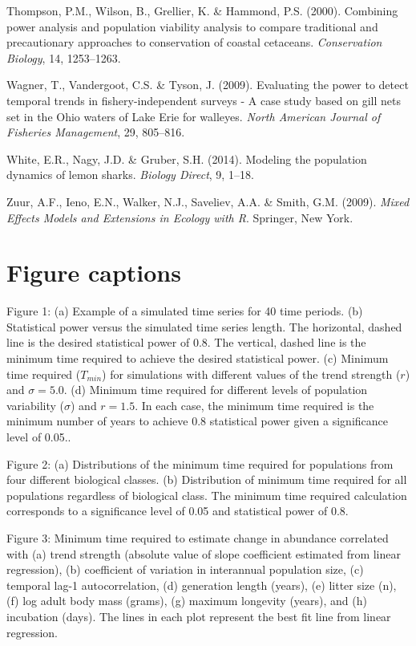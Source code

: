 \documentclass[12pt,]{article}
\begin{document}
\hypertarget{ref-Thompson2000}{}
Thompson, P.M., Wilson, B., Grellier, K. \& Hammond, P.S. (2000).
Combining power analysis and population viability analysis to compare
traditional and precautionary approaches to conservation of coastal
cetaceans. \emph{Conservation Biology}, 14, 1253--1263.

\hypertarget{ref-Wagner2009}{}
Wagner, T., Vandergoot, C.S. \& Tyson, J. (2009). Evaluating the power
to detect temporal trends in fishery-independent surveys - A case study
based on gill nets set in the Ohio waters of Lake Erie for walleyes.
\emph{North American Journal of Fisheries Management}, 29, 805--816.

\hypertarget{ref-White2014}{}
White, E.R., Nagy, J.D. \& Gruber, S.H. (2014). Modeling the population
dynamics of lemon sharks. \emph{Biology Direct}, 9, 1--18.

\hypertarget{ref-Zuur2009}{}
Zuur, A.F., Ieno, E.N., Walker, N.J., Saveliev, A.A. \& Smith, G.M.
(2009). \emph{Mixed Effects Models and Extensions in Ecology with R}.
Springer, New York.

\clearpage

\pagebreak

\section{Figure captions}\label{figure-captions}

Figure 1: (a) Example of a simulated time series for 40 time periods.
(b) Statistical power versus the simulated time series length. The
horizontal, dashed line is the desired statistical power of 0.8. The
vertical, dashed line is the minimum time required to achieve the
desired statistical power. (c) Minimum time required (\(T_{min}\)) for
simulations with different values of the trend strength (\(r\)) and
\(\sigma = 5.0\). (d) Minimum time required for different levels of
population variability (\(\sigma\)) and \(r=1.5\). In each case, the
minimum time required is the minimum number of years to achieve 0.8
statistical power given a significance level of 0.05..

Figure 2: (a) Distributions of the minimum time required for populations
from four different biological classes. (b) Distribution of minimum time
required for all populations regardless of biological class. The minimum
time required calculation corresponds to a significance level of 0.05
and statistical power of 0.8.

Figure 3: Minimum time required to estimate change in abundance
correlated with (a) trend strength (absolute value of slope coefficient
estimated from linear regression), (b) coefficient of variation in
interannual population size, (c) temporal lag-1 autocorrelation, (d)
generation length (years), (e) litter size (n), (f) log adult body mass
(grams), (g) maximum longevity (years), and (h) incubation (days). The
lines in each plot represent the best fit line from linear regression.
\end{document}
